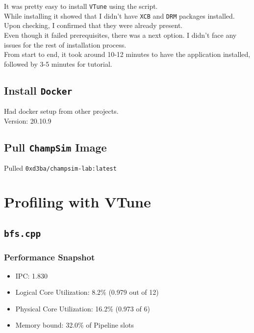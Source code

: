 \documentclass[11pt, swedish, openany]{book}
\begin{document}
It was pretty easy to install \texttt{VTune} using the script. \\
While installing it showed that I didn't have \texttt{XCB} and \texttt{DRM} packages installed. Upon checking, I confirmed that they were already present. \\
Even though it failed prerequisites, there was a next option. I didn't face any issues for the rest of installation process. \\
From start to end, it took around 10-12 minutes to have the application installed, followed by 3-5 minutes for tutorial.

\section*{Install \texttt{Docker}}
Had docker setup from other projects. \\
Version: 20.10.9

\section*{Pull \texttt{ChampSim} Image}
Pulled \texttt{0xd3ba/champsim-lab:latest}

\chapter{Profiling with VTune}
\section{\texttt{bfs.cpp}}

\subsection*{Performance Snapshot}
\begin{itemize}
    \item IPC: 1.830
    \item Logical Core Utilization: 8.2\% (0.979 out of 12)
    \item Physical Core Utilization: 16.2\% (0.973 of 6)
    \item Memory bound: 32.0\% of Pipeline slots
\end{itemize}
\end{document}
